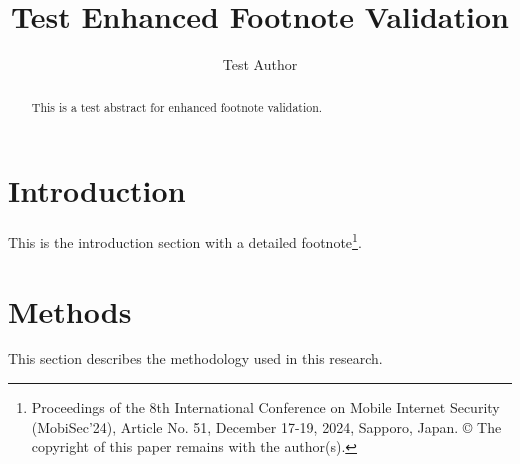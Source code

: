 \documentclass{easychair}
\title{Test Enhanced Footnote Validation}
\author{Test Author}
\begin{document}
\maketitle

\begin{abstract}
This is a test abstract for enhanced footnote validation.
\end{abstract}


\section{Introduction}
This is the introduction section with a detailed footnote\footnote{Proceedings of the 8th International Conference on Mobile Internet Security (MobiSec'24), Article No. 51, December 17-19, 2024, Sapporo, Japan. © The copyright of this paper remains with the author(s).}.

\section{Methods}
This section describes the methodology used in this research.
\end{document}
